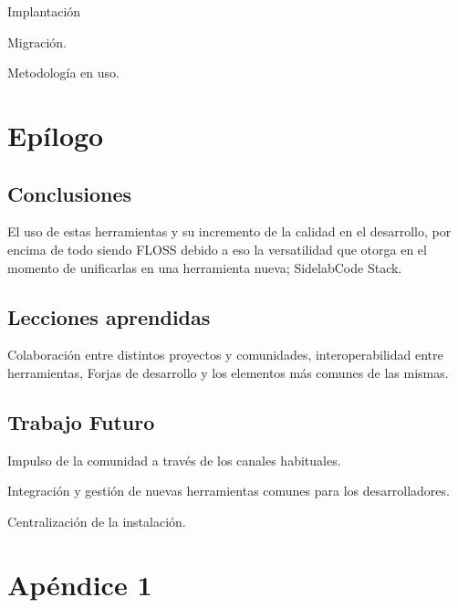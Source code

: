 \documentclass[a4paper, 12pt]{book}
\begin{document}
\par Implantaci\'on
\par Migraci\'on.
\par Metodolog\'ia en uso.


\chapter*{Ep\'ilogo}
\label{chap:epilogo}

\section{Conclusiones}
\label{sec:conclusiones}

\par El uso de estas herramientas y su incremento de la calidad en el desarrollo, por encima de todo siendo FLOSS debido a eso la versatilidad que otorga en el momento de unificarlas en una herramienta nueva; SidelabCode Stack.


\section{Lecciones aprendidas}
\label{sec:lecciones}

\par Colaboraci\'on entre distintos proyectos y comunidades, interoperabilidad entre herramientas, Forjas de desarrollo y los elementos m\'as comunes de las mismas.

\section{Trabajo Futuro}
\label{sec:trabajofuturo}

\par Impulso de la comunidad a trav\'es de los canales habituales.

\par Integraci\'on y gesti\'on de nuevas herramientas comunes para los desarrolladores.

\par Centralizaci\'on de la instalaci\'on.



\appendix
\chapter{Apéndice 1}
\label{app:primer}
\end{document}
